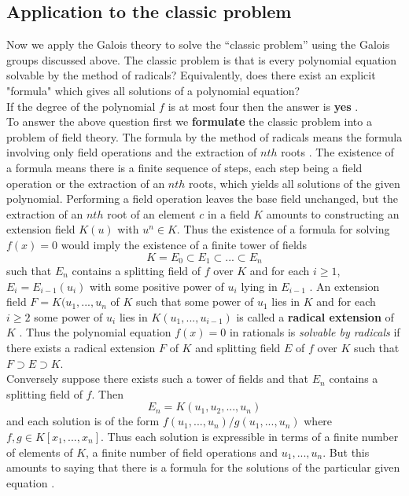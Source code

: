 \documentclass[a4paper,twoside,10pt]{article}
\theoremstyle{plain}
\theoremstyle{definition}
\begin{document}
\subsection{Application to the classic problem}
Now we apply the Galois theory to solve the ``classic problem'' using the Galois groups discussed above.  The classic problem is that is every polynomial equation solvable by the method of radicals? Equivalently, does there exist an explicit "formula" which gives all solutions of a polynomial equation? \\If the degree of  the polynomial \(f\) is at most four then the answer is \textbf{yes} \cite{hunger}.\\

\noindent
To answer the above question first we \textbf{formulate} the classic problem into a problem of field theory. The formula by the method of radicals means the formula involving only field operations and the extraction of \(nth\) roots \cite{hunger}. The existence of a formula means there is a finite sequence of steps, each step being a field operation or the extraction of an \(nth\) roots, which yields all solutions of the given polynomial. Performing a field operation leaves the base field unchanged, but the extraction of an \(nth\) root of an element
\(c\) in a field \(K\) amounts to constructing an extension field \(K(u)\) with \(u^n \in K\). Thus the existence of a formula for solving \(f(x)=0\) would imply the existence of a finite tower of fields
\[K=E_0 \subset E_1 \subset ... \subset E_n\]
such that \(E_n\) contains a splitting field of \(f\) over \(K\) and for each \(i \geq 1\), \(E_i=E_{i-1}(u_i)\) with some positive power of \(u_i\) lying in \(E_{i-1}\) \cite{hunger}. An extension field \(F=K(u_1,...,u_n\) of \(K\) such that some power of \(u_1\) lies in \(K\) and for each \(i \geq 2\) some power of \(u_i\) lies in \(K(u_1,...,u_{i-1})\) is called a \textbf{radical extension} of \(K\) \cite{hunger}. Thus the polynomial equation \(f(x)=0\) in rationals is \textit{solvable by radicals} if there exists a radical extension \(F\) of \(K\) and splitting field \(E\) of \(f\) over \(K\) such that \(F \supset E \supset K\). \\[2mm]
Conversely suppose there exists such a tower of fields and that \(E_n\) contains a splitting field of \(f\). Then
\[E_n = K(u_1,u_2,...,u_n)\]
and each solution is of the form \(f(u_1,...,u_n)/g(u_1,...,u_n)\) where \(f,g \in K[x_1,...,x_n]\). Thus each solution is expressible in terms of a finite number of elements of \(K\), a finite number of field operations and \(u_1,...,u_n\). But this amounts to saying that there is a formula for the solutions of the particular given equation \cite{hunger}.
\end{document}
